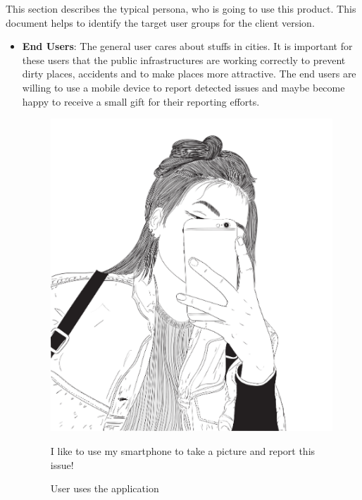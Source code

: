 This section describes the typical persona, who is going to use this product. This document helps to identify the target user groups for the client version.
\begin{itemize}
    \item \textbf{End Users}: The general user cares about stuffs in cities. It is important for these users that the public infrastructures are working correctly to prevent dirty places, accidents and to make places more attractive. The end users are willing to use a mobile device to report detected issues and maybe become happy to receive a small gift for their reporting efforts.
    
    \begin{figure}[h]
        \centering
        \caption{User uses the application}
        \label{fig:user-uses-the-app}
        \begin{minipage}{0.4\textwidth}
            \includegraphics[width=\linewidth]{images/Image_ (1).png} 
        \end{minipage}%
        \hspace{0.05\textwidth} %
        \begin{minipage}{0.5\textwidth}
            I like to use my smartphone to take a picture and report this issue!

\end{minipage}
\end{figure}
\end{itemize}

